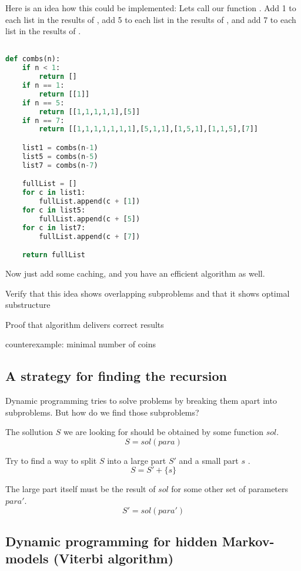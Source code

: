 Here is an idea how this could be implemented: 
Lets call our function .
Add 1 to each list in the results of ,
add 5 to each list in the results of , 
and add 7 to each list in the results of .


\begin{lstlisting}[language=python]

def combs(n):
	if n < 1:
		return []
	if n == 1:
		return [[1]]
	if n == 5:
		return [[1,1,1,1,1],[5]]
	if n == 7:
		return [[1,1,1,1,1,1,1],[5,1,1],[1,5,1],[1,1,5],[7]]

	list1 = combs(n-1)
	list5 = combs(n-5)
	list7 = combs(n-7)

	fullList = []
	for c in list1:
		fullList.append(c + [1])
	for c in list5:
		fullList.append(c + [5])
	for c in list7: 
		fullList.append(c + [7])

	return fullList

\end{lstlisting}

Now just add some caching, and you have an efficient algorithm as well. 

Verify that this idea shows overlapping subproblems
and that it shows optimal substructure

Proof that algorithm delivers correct results


counterexample: minimal number of coins


\subsection{A strategy for finding the recursion}

Dynamic programming tries to solve problems by breaking them apart into subproblems. But how do we find those subproblems?

The sollution $S$ we are looking for should be obtained by some function $sol$.
$$ S = sol(para) $$

Try to find a way to split $S$ into a large part $S'$ and a small part $s$ .
$$ S = S' + \{ s \} $$

The large part itself must be the result of $sol$ for some other set of parameters $para'$.
$$ S' = sol(para') $$


\subsection{Dynamic programming for hidden Markov-models (Viterbi algorithm)}
